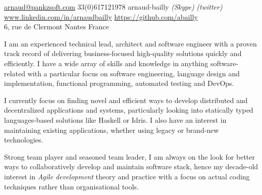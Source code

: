 \documentclass[12pt,a4paper]{article}
\begin{document}
\sloppy


\noindent\href{mailto:arnaud.at.pankzsoft.dot.com}{arnaud\mbox{}@\mbox{}pankzsoft.com}\sbull
\textsmaller{+}33(0)617121978\sbull
{\newnums arnaud-bailly} \emph{(Skype)} \emph{(twitter)}\sbull
\href{http://www.linkedin.com/in/arnaudbailly}{www.linkedin.com/in/arnaudbailly} \sbull
\href{https://github.com/abailly}{https://github.com/abailly} \\
6, rue de Clermont Nantes\sbull
France

\spacedhrule{0.9em}{-0.4em}  %


\begin{multicols}{2}  %
  I am an experienced technical lead, architect and software engineer with a proven track record of delivering business-focused high-quality solutions quickly and efficiently. I have a wide array of skills and knowledge in anything software-related with a particular focus on software engineering, language design and implementation, functional programming, automated testing and DevOps.

  I currently focus on finding novel and efficient ways to develop distributed and decentralized applications and systems, particularly looking into statically typed languages-based solutions like Haskell or Idris. I also have an interest in maintaining existing applications, whether using legacy or brand-new technologies.

  Strong team player and seasoned team leader, I am always on the look for better ways to collaboratively develop and maintain software stack, hence my decade-old interest in \emph{Agile development} theory and practice with a focus on actual coding techniques rather than organisational tools.
\end{multicols}



\end{document}
